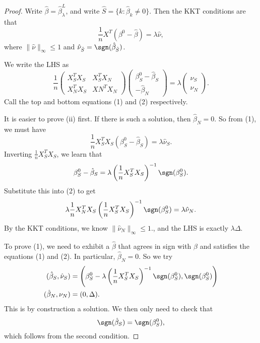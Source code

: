 \documentclass[a4paper]{article}
\begin{document}
\begin{proof}
  Write $\hat{\beta} = \hat{\beta}^L_\lambda$, and write $\hat{S} = \{k: \hat{\beta}_k \not= 0\}$. Then the KKT conditions are that
  \[
    \frac{1}{n} X^T (\beta^0 - \hat{\beta}) = \lambda \hat{\nu},
  \]
  where $\|\hat{\nu}\|_{\infty} \leq 1$ and $\hat{\nu}_{\hat{S}} = \sgn (\hat{\beta}_{\hat{S}})$.

  We write the LHS as
  \[
    \frac{1}{n}
    \begin{pmatrix}
      X_S^T X_S & X_S^T X_N\\
      X_N^T X_S & XN^T X_N
    \end{pmatrix}
    \begin{pmatrix}
      \beta^0_S - \hat{\beta}_S\\
      -\hat{\beta}_N
    \end{pmatrix} = \lambda
    \begin{pmatrix}
      \hat{\nu}_S\\
      \hat{\nu}_N
    \end{pmatrix}.
  \]
  Call the top and bottom equations (1) and (2) respectively.

  It is easier to prove (ii) first. If there is such a solution, then $\hat{\beta}_N = 0$. So from (1), we must have
  \[
    \frac{1}{n} X_S^T X_S (\beta^0_S - \hat{\beta}_S) = \lambda \hat{\nu}_S.
  \]
  Inverting $\frac{1}{n} X_S^T X_S$, we learn that
  \[
    \beta^0_S - \hat{\beta}_S = \lambda \left(\frac{1}{n} X_S^T X_S\right)^{-1} \sgn (\beta^0_S).
  \]
  Substitute this into (2) to get
  \[
    \lambda \frac{1}{n} X_N^T X_S \left(\frac{1}{n} X_S^T X_S\right)^{-1} \sgn (\beta^0_S) = \lambda \hat{\nu}_N.
  \]
  By the KKT conditions, we know $\|\hat{\nu}_N\|_\infty \leq 1$., and the LHS is exactly $\lambda\Delta$.

  To prove (1), we need to exhibit a $\hat{\beta}$ that agrees in sign with $\hat{\beta}$ and satisfies the equations (1) and (2). In particular, $\hat{\beta}_N = 0$. So we try
  \begin{align*}
    (\hat{\beta}_S, \hat{\nu}_S) &= \left(\beta^0_S - \lambda \left(\frac{1}{n} X_S^T X_S\right)^{-1} \sgn (\beta^0_S), \sgn (\beta^0_S)\right)\\
    (\hat{\beta}_N, \nu_N) &= (0, \Delta).
  \end{align*}
  This is by construction a solution. We then only need to check that
  \[
    \sgn (\hat{\beta}_S) = \sgn (\beta^0_S),
  \]
  which follows from the second condition.
\end{proof}
\end{document}
